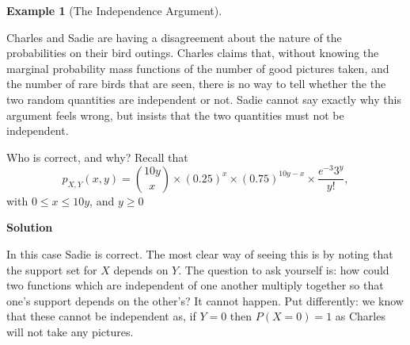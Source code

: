 \documentclass[
  letterpaper,
  DIV=11,
  numbers=noendperiod]{scrreprt}
\theoremstyle{definition}
\theoremstyle{definition}
\theoremstyle{definition}
\newtheorem{example}{Example}[chapter]
\theoremstyle{remark}
\begin{document}
\begin{example}[The Independence
Argument]\protect\hypertarget{exm-independence-arg}{}\label{exm-independence-arg}

Charles and Sadie are having a disagreement about the nature of the
probabilities on their bird outings. Charles claims that, without
knowing the marginal probability mass functions of the number of good
pictures taken, and the number of rare birds that are seen, there is no
way to tell whether the the two random quantities are independent or
not. Sadie cannot say exactly why this argument feels wrong, but insists
that the two quantities must not be independent.

Who is correct, and why? Recall that
\[p_{X,Y}(x, y) = \binom{10y}{x}\times(0.25)^{x}\times(0.75)^{10y - x}\times\frac{e^{-3}3^y}{y!},\]
with \(0 \leq x \leq 10y\), and \(y \geq 0\)

\begin{tcolorbox}[enhanced jigsaw, colback=white, breakable, rightrule=.15mm, leftrule=.75mm, toprule=.15mm, left=2mm, arc=.35mm, opacityback=0, bottomrule=.15mm]

\vspace{-3mm}\textbf{Solution}\vspace{3mm}

In this case Sadie is correct. The most clear way of seeing this is by
noting that the support set for \(X\) depends on \(Y\). The question to
ask yourself is: how could two functions which are independent of one
another multiply together so that one's support depends on the other's?
It cannot happen. Put differently: we know that these cannot be
independent as, if \(Y=0\) then \(P(X=0)=1\) as Charles will not take
any pictures.

\end{tcolorbox}

\end{example}
\end{document}
